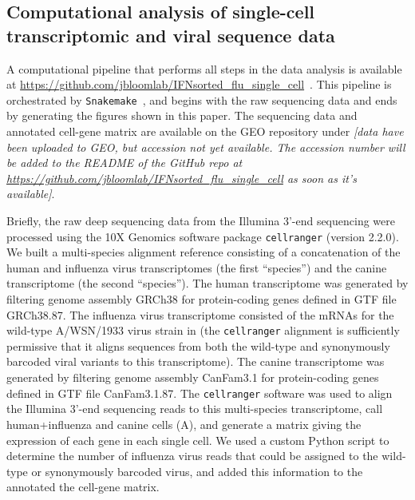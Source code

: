 \documentclass[9pt,lineno]{elife}
\newcommand{\jdbcomment}[1]{\emph{\color{red} [#1]}}
\begin{document}
\subsection{Computational analysis of single-cell transcriptomic and viral sequence data}
A computational pipeline that performs all steps in the data analysis is available at \url{https://github.com/jbloomlab/IFNsorted_flu_single_cell}~\citep{russell2018github}. 
This pipeline is orchestrated by \texttt{Snakemake}~\citep{koster2012snakemake}, and begins with the raw sequencing data and ends by generating the figures shown in this paper.
The sequencing data and annotated cell-gene matrix are available on the GEO repository under \jdbcomment{data have been uploaded to GEO, but accession not yet available. The accession number will be added to the README of the GitHub repo at \url{https://github.com/jbloomlab/IFNsorted_flu_single_cell} as soon as it's available}.

Briefly, the raw deep sequencing data from the Illumina 3'-end sequencing were processed using the 10X Genomics software package \texttt{cellranger} (version 2.2.0). 
We built a multi-species alignment reference consisting of a concatenation of the human and influenza virus transcriptomes (the first ``species'') and the canine transcriptome (the second ``species''). 
The human transcriptome was generated by filtering genome assembly GRCh38 for protein-coding genes defined in GTF file GRCh38.87.
The influenza virus transcriptome consisted of the mRNAs for the wild-type A/WSN/1933 virus strain in  (the \texttt{cellranger} alignment is sufficiently permissive that it aligns sequences from both the wild-type and synonymously barcoded viral variants to this transcriptome).
The canine transcriptome was generated by filtering genome assembly CanFam3.1 for protein-coding genes defined in GTF file CanFam3.1.87.
The \texttt{cellranger} software was used to align the Illumina 3'-end sequencing reads to this multi-species transcriptome, call human+influenza and canine cells (A), and generate a matrix giving the expression of each gene in each single cell.
We used a custom Python script to determine the number of influenza virus reads that could be assigned to the wild-type or synonymously barcoded virus, and added this information to the annotated the cell-gene matrix.
\end{document}
